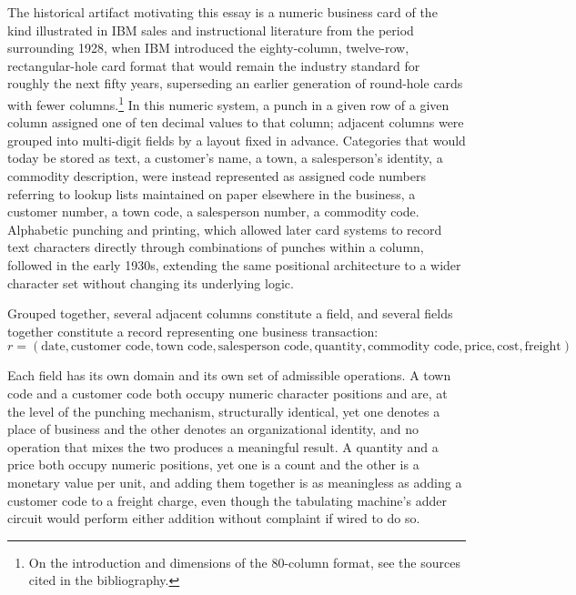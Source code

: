 \documentclass[11pt]{article}
\begin{document}
The historical artifact motivating this essay is a numeric business card of the kind illustrated in IBM sales and instructional literature from the period surrounding 1928, when IBM introduced the eighty-column, twelve-row, rectangular-hole card format that would remain the industry standard for roughly the next fifty years, superseding an earlier generation of round-hole cards with fewer columns.\footnote{On the introduction and dimensions of the 80-column format, see the sources cited in the bibliography.} In this numeric system, a punch in a given row of a given column assigned one of ten decimal values to that column; adjacent columns were grouped into multi-digit fields by a layout fixed in advance. Categories that would today be stored as text, a customer's name, a town, a salesperson's identity, a commodity description, were instead represented as assigned code numbers referring to lookup lists maintained on paper elsewhere in the business, a customer number, a town code, a salesperson number, a commodity code. Alphabetic punching and printing, which allowed later card systems to record text characters directly through combinations of punches within a column, followed in the early 1930s, extending the same positional architecture to a wider character set without changing its underlying logic.

Grouped together, several adjacent columns constitute a field, and several fields together constitute a record representing one business transaction:
\[
r = (\text{date}, \text{customer code}, \text{town code}, \text{salesperson code}, \text{quantity}, \text{commodity code}, \text{price}, \text{cost}, \text{freight}).
\]

Each field has its own domain and its own set of admissible operations. A town code and a customer code both occupy numeric character positions and are, at the level of the punching mechanism, structurally identical, yet one denotes a place of business and the other denotes an organizational identity, and no operation that mixes the two produces a meaningful result. A quantity and a price both occupy numeric positions, yet one is a count and the other is a monetary value per unit, and adding them together is as meaningless as adding a customer code to a freight charge, even though the tabulating machine's adder circuit would perform either addition without complaint if wired to do so.
\end{document}
